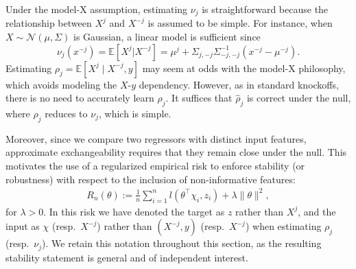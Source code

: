 \documentclass{article}
\theoremstyle{plain}
\theoremstyle{definition}
\theoremstyle{remark}
\begin{document}
Under the model-X assumption, estimating $\nu_j$ is straightforward because the relationship between $X^{j}$ and $X^{-j}$ is assumed to be simple. For instance, when $X\sim \mathcal{N}(\mu,\Sigma)$ is Gaussian, a linear model is sufficient since
\[
\nu_j(x^{-j})=\mathbb{E}[X^{j}|X^{-j}]
=\mu^{j} + \Sigma_{j,-j}\Sigma^{-1}_{-j,-j}(x^{-j}-\mu^{-j}).
\]
Estimating $\rho_j=\mathbb{E}[X^{j}\mid X^{-j},y]$ may seem at odds with the model-X philosophy, which avoids modeling the $X$-$y$ dependency. However, as in standard knockoffs, there is no need to accurately learn $\rho_j$. It suffices that $\widehat{\rho}_j$ is correct under the null, where $\rho_j$ reduces to $\nu_j$, which is simple.

Moreover, since we compare two regressors with distinct input features, approximate exchangeability requires that they remain close under the null. This motivates the use of a regularized empirical risk to enforce stability (or robustness) with respect to the inclusion of non-informative features:%
 \begin{align}
     R_n(\theta):=\frac{1}{n}\sum_{i=1}^n l(\theta^\top \chi_i, z_i)+\lambda \|\theta\|^2,
     \label{eq:reg-emp-risk}
 \end{align}
 for $\lambda>0$. In this risk we have denoted the target as $z$ rather than $X^{j}$, and the input as $\chi$ (resp.\ $X^{-j}$) rather than $(X^{-j},y)$ (resp.\ $X^{-j}$) when estimating $\rho_j$ (resp.\ $\nu_j$). We retain this notation throughout this section, as the resulting stability statement is general and of independent interest. 

\end{document}
